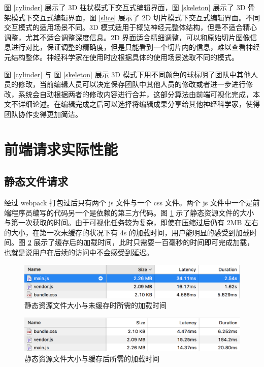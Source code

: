 图 \ref{cylinder} 展示了 3D 柱状模式下交互式编辑界面，图 \ref{skeleton} 展示了 3D 骨架模式下交互式编辑界面，图 \ref{slice} 展示了 2D 切片模式下交互式编辑界面。不同交互模式的适用场景不同。3D 模式适用于概览神经元整体结构，但是不适合精心调整，尤其不适合调整深度信息。2D 界面适合精细调整，可以和原始切片图像信息进行对比，保证调整的精确度，但是只能看到一个切片内的信息，难以查看神经元结构整体。神经科学家在使用时应根据具体的使用场景选取不同的模式。

图 \ref{cylinder} 与 图 \ref{skeleton} 展示 3D 模式下用不同颜色的球标明了团队中其他人员的修改，当前编辑人员可以决定保存团队中其他人员的修改或者进一步进行修改，系统会自动根据两者的修改内容进行合并，这部分算法由前端可视化完成，本文不详细论述。在编辑完成之后可以选择将编辑成果分享给其他神经科学家，使得团队协作变得更加简洁。

\section{前端请求实际性能}
\subsection{静态文件请求}
经过 webpack 打包过后只有两个 js 文件与一个 css 文件。两个 js 文件中一个是前端程序员编写的代码另一个是依赖的第三方代码。图 \ref{file-nocache} 示了静态资源文件的大小与第一次获取的时间。由于可视化任务较为复杂，即使在压缩过后仍有 2MB 左右的大小，在第一次未缓存的状况下有 4s 的加载时间，用户能明显的感受到加载时间。图 \ref{file-cache} 展示了缓存后的加载时间，此时只需要一百毫秒的时间即可完成加载，也就是说用户在后续的访问中不会感受到延迟。 

\begin{figure}[!ht]
\centering
\includegraphics[width=148mm]{images/file-nocache}
\caption{静态资源文件大小与未缓存时所需的加载时间}
\label{file-nocache}
\end{figure}

\begin{figure}[!ht]
\centering
\includegraphics[width=148mm]{images/file-cache}
\caption{静态资源文件大小与缓存后所需的加载时间}
\label{file-cache}
\end{figure}

